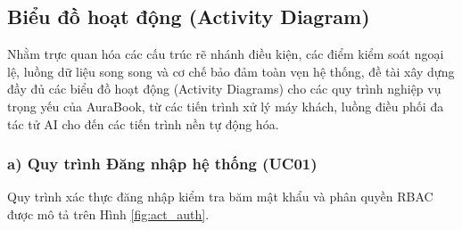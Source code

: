 \documentclass[11pt, a4paper]{report}
\begin{document}
\subsection{Biểu đồ hoạt động (Activity Diagram)}

Nhằm trực quan hóa các cấu trúc rẽ nhánh điều kiện, các điểm kiểm soát ngoại lệ, luồng dữ liệu song song và cơ chế bảo đảm toàn vẹn hệ thống, đề tài xây dựng đầy đủ các biểu đồ hoạt động (Activity Diagrams) cho các quy trình nghiệp vụ trọng yếu của AuraBook, từ các tiến trình xử lý máy khách, luồng điều phối đa tác tử AI cho đến các tiến trình nền tự động hóa.

\subsubsection{a) Quy trình Đăng nhập hệ thống (UC01)}

Quy trình xác thực đăng nhập kiểm tra băm mật khẩu và phân quyền RBAC được mô tả trên Hình \ref{fig:act_auth}.
\end{document}
